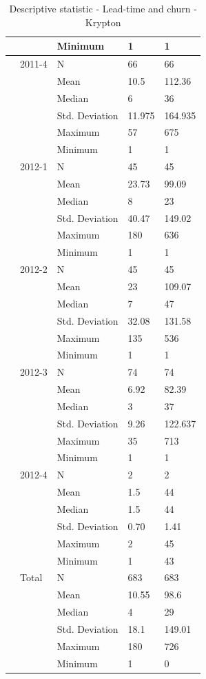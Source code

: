 \documentclass[UKenglish]{ifimaster}  %
\begin{document}
\begin{table}[!htbp]
\begin{adjustwidth}{-2cm}{}
{\begin{tabular}{ | l | l | l | l | l | }
	 &  & Minimum & 1 & 1 \\ \hline
	 & 2011-4 & N & 66 & 66 \\ \hline
	 &  & Mean & 10.5 & 112.36 \\ \hline
	 &  & Median & 6 & 36 \\ \hline
	 &  & Std. Deviation & 11.975 & 164.935 \\ \hline
	 &  & Maximum & 57 & 675 \\ \hline
	 &  & Minimum & 1 & 1 \\ \hline
	 & 2012-1 & N & 45 & 45 \\ \hline
	 &  & Mean & 23.73 & 99.09 \\ \hline
	 &  & Median & 8 & 23 \\ \hline
	 &  & Std. Deviation & 40.47& 149.02 \\ \hline
	 &  & Maximum & 180 & 636 \\ \hline
	 &  & Minimum & 1 & 1 \\ \hline
	 & 2012-2 & N & 45 & 45 \\ \hline
	 &  & Mean & 23 & 109.07 \\ \hline
	 &  & Median & 7 & 47 \\ \hline
	 &  & Std. Deviation & 32.08 & 131.58 \\ \hline
	 &  & Maximum & 135 & 536 \\ \hline
	 &  & Minimum & 1 & 1 \\ \hline
	 & 2012-3 & N & 74 & 74 \\ \hline
	 &  & Mean & 6.92 & 82.39 \\ \hline
	 &  & Median & 3 & 37 \\ \hline
	 &  & Std. Deviation & 9.26 & 122.637 \\ \hline
	 &  & Maximum & 35 & 713 \\ \hline
	 &  & Minimum & 1 & 1 \\ \hline
	 & 2012-4 & N & 2 & 2 \\ \hline
	 &  & Mean & 1.5 & 44 \\ \hline
	 &  & Median & 1.5 & 44 \\ \hline
	 &  & Std. Deviation & 0.70 & 1.41 \\ \hline
	 &  & Maximum & 2 & 45 \\ \hline
	 &  & Minimum & 1 & 43 \\ \hline
	 & Total & N & 683 & 683 \\ \hline
	 &  & Mean & 10.55 & 98.6 \\ \hline
	 &  & Median & 4 & 29 \\ \hline
	 &  & Std. Deviation & 18.1 & 149.01 \\ \hline
	 &  & Maximum & 180 & 726 \\ \hline
	 &  & Minimum & 1 & 0 \\ \hline
\end{tabular}
 }
\caption{Descriptive statistic  - Lead-time and churn - Krypton}

\end{adjustwidth}
 \end{table}%
 
\end{document}
